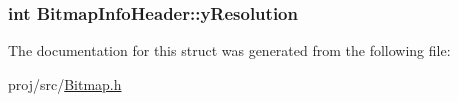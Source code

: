 \subsubsection[{\texorpdfstring{y\+Resolution}{yResolution}}]{\setlength{\rightskip}{0pt plus 5cm}int Bitmap\+Info\+Header\+::y\+Resolution}\hypertarget{structBitmapInfoHeader_af2fadf9c216cc9f3ce401096e35be1b7}{}\label{structBitmapInfoHeader_af2fadf9c216cc9f3ce401096e35be1b7}


The documentation for this struct was generated from the following file\+:\begin{DoxyCompactItemize}
\item 
proj/src/\hyperlink{Bitmap_8h}{Bitmap.\+h}\end{DoxyCompactItemize}
